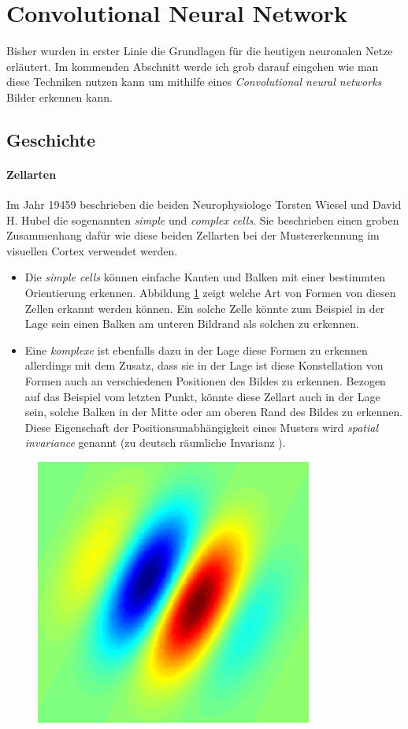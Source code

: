 \section{Convolutional Neural Network} \label{sc:cnn}
Bisher wurden in erster Linie die Grundlagen für die heutigen neuronalen Netze erläutert. Im kommenden Abschnitt werde ich grob darauf eingehen wie man diese Techniken nutzen kann um mithilfe eines \emph{Convolutional neural networks} Bilder erkennen kann. 


\subsection{Geschichte}

\paragraph{Zellarten} 
Im Jahr 19459 beschrieben die beiden Neurophysiologe Torsten Wiesel und David H. Hubel die sogenannten \emph{simple} und \emph{complex cells}. Sie beschrieben einen groben Zusammenhang dafür wie diese beiden Zellarten bei der Mustererkennung im visuellen Cortex verwendet werden. 

\begin{itemize}
\item Die \emph{simple cells} können einfache Kanten und Balken mit einer bestimmten Orientierung erkennen. Abbildung \ref{fig:gabor_filter} zeigt welche Art von Formen von diesen Zellen erkannt werden können. Ein solche Zelle könnte zum Beispiel in der Lage sein einen Balken am unteren Bildrand als solchen zu erkennen. 

\item Eine \emph{komplexe} ist ebenfalls dazu in der Lage diese Formen zu erkennen allerdings mit dem Zusatz, dass sie in der Lage ist diese Konstellation von Formen auch an verschiedenen Positionen des Bildes zu erkennen. Bezogen auf das Beispiel vom letzten Punkt, könnte diese Zellart auch in der Lage sein, solche Balken in der Mitte oder am oberen Rand des Bildes zu erkennen. Diese Eigenschaft der Positionsunabhängigkeit eines Musters wird \emph{spatial invariance} genannt (zu deutsch \glqq räumliche Invarianz \grqq ).
\end{itemize}

\begin{figure}[!htb]
	\centering
	\includegraphics[width=.5\linewidth]{img/gabor_filter}
	\label{fig:gabor_filter}
\end{figure}

